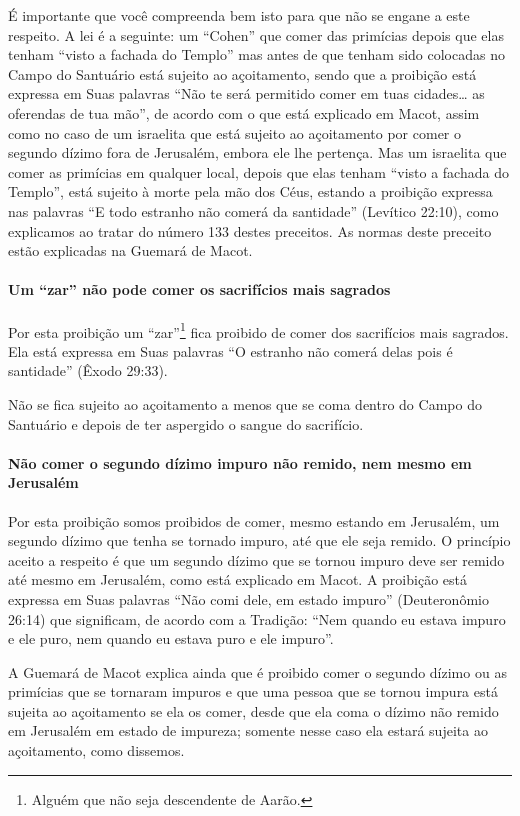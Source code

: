 É importante que você compreenda bem isto para que não se engane a este
respeito. A lei é a seguinte: um ``Cohen'' que comer das primícias
depois que elas tenham ``visto a fachada do Templo'' mas antes de que
tenham sido colocadas no Campo do Santuário está sujeito ao açoitamento,
sendo que a proibição está expressa em Suas palavras ``Não te será
permitido comer em tuas cidades\ldots{} as oferendas de tua mão'', de acordo
com o que está explicado em Macot, assim como no caso de um israelita
que está sujeito ao açoitamento por comer o segundo dízimo fora de
Jerusalém, embora ele lhe pertença. Mas um israelita que comer as
primícias em qualquer local, depois que elas tenham
``visto a fachada do Templo'', está sujeito à morte pela mão dos Céus,
estando
a proibição expressa nas palavras ``E todo estranho não comerá da
santidade'' (Levítico 22:10), como explicamos ao tratar do número 133
destes preceitos.
As normas deste preceito estão explicadas na Guemará de Macot.

\paragraph{Um ``zar'' não pode comer os sacrifícios mais sagrados}

Por esta proibição um ``zar''\footnote{Alguém que não seja descendente de Aarão.} fica proibido de
comer dos sacrifícios mais sagrados. Ela está expressa em Suas palavras
``O estranho não comerá delas pois é santidade'' (Êxodo 29:33).

Não se fica sujeito ao açoitamento a menos que se coma dentro do Campo
do Santuário e depois de ter aspergido o sangue do sacrifício.

\paragraph{Não comer o segundo dízimo impuro não remido, nem mesmo em Jerusalém}

Por esta proibição somos proibidos de comer, mesmo estando em Jerusalém,
um segundo dízimo que tenha se tornado impuro, até que ele seja remido.
O princípio aceito a respeito é que um segundo dízimo que se tornou
impuro deve ser remido até mesmo em Jerusalém, como está explicado em
Macot. A proibição está expressa em Suas palavras ``Não comi dele, em
estado impuro'' (Deuteronômio 26:14) que significam, de acordo com a
Tradição: ``Nem quando eu estava impuro e ele puro, nem quando eu estava
puro e ele impuro''.

A Guemará de Macot explica ainda que é proibido comer o segundo dízimo
ou as primícias que se tornaram impuros e que uma pessoa que se tornou
impura está sujeita ao açoitamento se ela os comer, desde que ela coma o
dízimo não remido em Jerusalém em estado de impureza; somente nesse
caso ela estará sujeita ao açoitamento, como dissemos.

